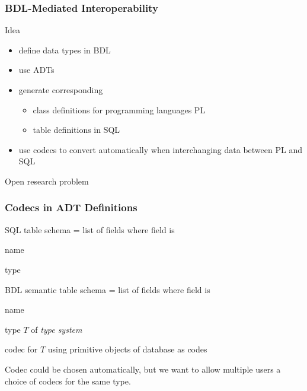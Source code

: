 \begin{frame}\frametitle{BDL-Mediated Interoperability}
Idea
 \begin{itemize}
 \item define data types in BDL 
 \item use ADTs
 \item generate corresponding
  \begin{itemize}
  \item class definitions for programming languages PL
  \item table definitions in SQL
  \end{itemize}
 \item use codecs to convert automatically when interchanging data between PL and SQL
 \end{itemize}

Open research problem
\end{frame}

\begin{frame}\frametitle{Codecs in ADT Definitions}
\begin{blockitems}{SQL table schema = list of fields where field is}
\item name
\item type 
\end{blockitems}

\begin{blockitems}{BDL semantic table schema = list of fields where field is}
\item name
\item type $T$ of \emph{type system} 
\item codec for $T$ using primitive objects of database as codes
\end{blockitems}

Codec could be chosen automatically, but we want to allow multiple users a choice of codecs for the same type.
\end{frame}

